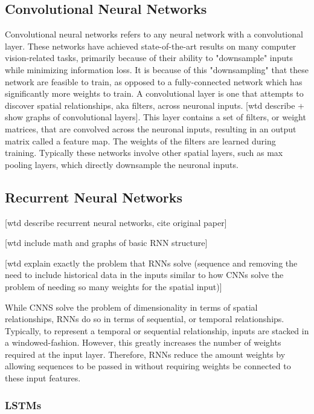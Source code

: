 \subsection{Convolutional Neural Networks}

Convolutional neural networks refers to any neural network with a convolutional layer.  These networks have achieved state-of-the-art results on many computer vision-related tasks, primarily because of their ability to "downsample" inputs while minimizing information loss.  It is because of this "downsampling" that these network are feasible to train, as opposed to a fully-connected network which has significantly more weights to train.  A convolutional layer is one that attempts to discover spatial relationships, aka filters, across neuronal inputs. [wtd describe + show graphs of convolutional layers].  This layer contains a set of filters, or weight matrices, that are convolved across the neuronal inputs, resulting in an output matrix called a feature map.  The weights of the filters are learned during training.  Typically these networks involve other spatial layers, such as max pooling layers, which directly downsample the neuronal inputs.

\subsection{Recurrent Neural Networks}

[wtd describe recurrent neural networks, cite original paper]

[wtd include math and graphs of basic RNN structure]

[wtd explain exactly the problem that RNNs solve (sequence and removing the need to include historical data in the inputs similar to how CNNs solve the problem of needing so many weights for the spatial input)]

While CNNS solve the problem of dimensionality in terms of spatial relationships, RNNs do so in terms of sequential, or temporal relationships.  Typically, to represent a temporal or sequential relationship, inputs are stacked in a windowed-fashion.  However, this greatly increases the number of weights required at the input layer.  Therefore, RNNs reduce the amount weights by allowing sequences to be passed in without requiring weights be connected to these input features.

\subsubsection{LSTMs}

